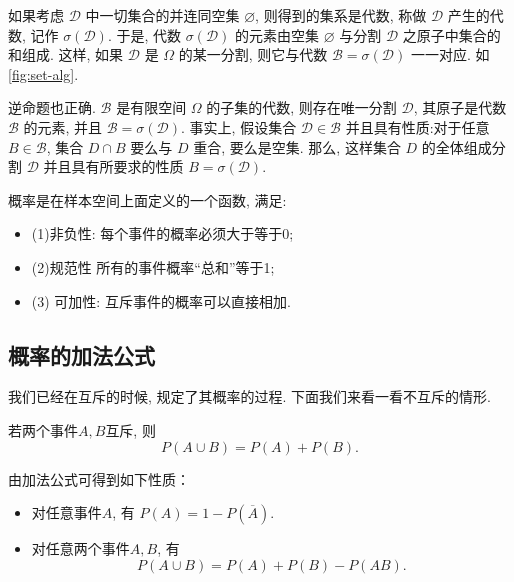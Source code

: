 如果考虑 $\mathscr{D}$ 中一切集合的并连同空集 $\varnothing$, 则得到的集系是代数, 称做 $\mathscr{D}$ 产生的代数, 记作 $\sigma(\mathscr{D})$. 于是, 代数 $\sigma(\mathscr{D})$ 的元素由空集 $\varnothing$ 与分割 $\mathscr{D}$ 之原子中集合的和组成.
这样, 如果 $\mathscr{D}$ 是 $\Omega$ 的某一分割, 则它与代数 $\mathscr{B}=\sigma(\mathscr{D})$ 一一对应. 如\cref{fig:set-alg}.



逆命题也正确. $\mathscr{B}$ 是有限空间 $\Omega$ 的子集的代数, 则存在唯一分割 $\mathscr{D}$, 其原子是代数 $\mathscr{B}$ 的元素, 并且 $\mathscr{B}=\sigma(\mathscr{D})$. 事实上, 假设集合 $\mathscr{D} \in \mathscr{B}$ 并且具有性质:对于任意 $B \in \mathscr{B}$, 集合 $D \cap B$ 要么与 $D$ 重合, 要么是空集. 那么, 这样集合 $D$ 的全体组成分割 $\mathscr{D}$ 并且具有所要求的性质 $B=\sigma(\mathscr{D})$. 



\begin{takeaway}
    概率是在样本空间上面定义的一个函数, 满足: 
    \begin{itemize}
        \item (1)非负性: 每个事件的概率必须大于等于0; 
        \item (2)规范性
        所有的事件概率``总和''等于1; 
        \item (3) 可加性: 互斥事件的概率可以直接相加.
    \end{itemize}
\end{takeaway}
    


\subsection{概率的加法公式}
我们已经在互斥的时候, 规定了其概率的过程. 下面我们来看一看不互斥的情形.
\begin{proposition}[加法公式]
    若两个事件$A,B$互斥, 则
    $$P(A\cup B)=P(A)+P(B).$$
\end{proposition}

\begin{remark}
    由加法公式可得到如下性质：
    \begin{itemize}
        \item 对任意事件$A$, 有
              $P(A)=1-P\left(\overline{A}\right).$
        \item 对任意两个事件$A,B$, 有
              $$P(A\cup B)=P(A)+P(B)-P(AB).$$
    \end{itemize}
\end{remark}

